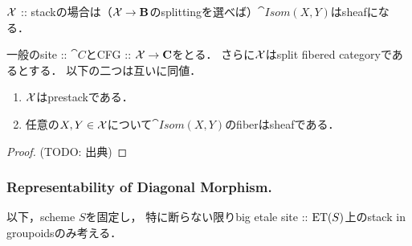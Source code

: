 \documentclass[a4paper, dvipdfmx]{jsarticle}
\newcommand{\Isom}{\cat{Isom}}
\begin{document}
$\mathcal{X}$ :: stackの場合は（$\mathcal{X} \to \mathbf{B}$のsplittingを選べば）$\Isom(X, Y)$はsheafになる．
\begin{Lemma}
    一般のsite :: $\cat{C}$とCFG :: $\mathcal{X} \to \mathbf{C}$をとる．
    さらに$\mathcal{X}$はsplit fibered categoryであるとする．
    以下の二つは互いに同値．
    \begin{enumerate}
        \item $\mathcal{X}$はprestackである．
        \item 任意の$X, Y \in \mathcal{X}$について$\Isom(X, Y)$のfiberはsheafである．
    \end{enumerate}
\end{Lemma}
\begin{proof}
    (TODO: 出典)
\end{proof}

\subsubsection{Representability of Diagonal Morphism.}
\begin{Remark}
    以下，scheme $S$を固定し，
    特に断らない限りbig etale site :: $\mathrm{ET}(S)$上のstack in groupoidsのみ考える．
\end{Remark}
\end{document}
